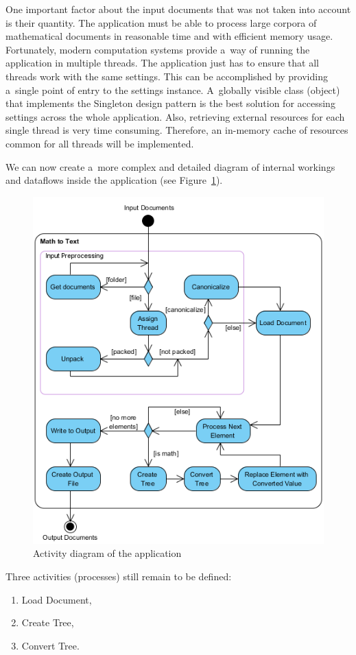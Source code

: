 \documentclass[11pt,oneside,final]{fithesis2}
\begin{document}
One important factor about the input documents that was not taken into account is their quantity. The application must be able to process large corpora of mathematical documents in reasonable time and with efficient memory usage. Fortunately, modern computation systems provide a~way of running the application in multiple threads. The application just has to ensure that all threads work with the same settings. This can be accomplished by providing a~single point of entry to the settings instance. A~globally visible class (object) that implements the Singleton design pattern is the best solution for accessing settings across the whole application. Also, retrieving external resources for each single thread is very time consuming. Therefore, an in-memory cache of resources common for all threads will be implemented.

We can now create a~more complex and detailed diagram of internal workings and dataflows inside the application (see Figure~\ref{fig:activitydiagramall}). 

\begin{figure}[!ht]
\centering
\includegraphics[width=\textwidth]{activity_diagram_all}
\caption{Activity diagram of the application}
\label{fig:activitydiagramall}
\end{figure}
\newpage
Three activities (processes) still remain to be defined:
\begin{enumerate}
\item Load Document,
\item Create Tree,
\item Convert Tree.
\end{enumerate}
\end{document}
